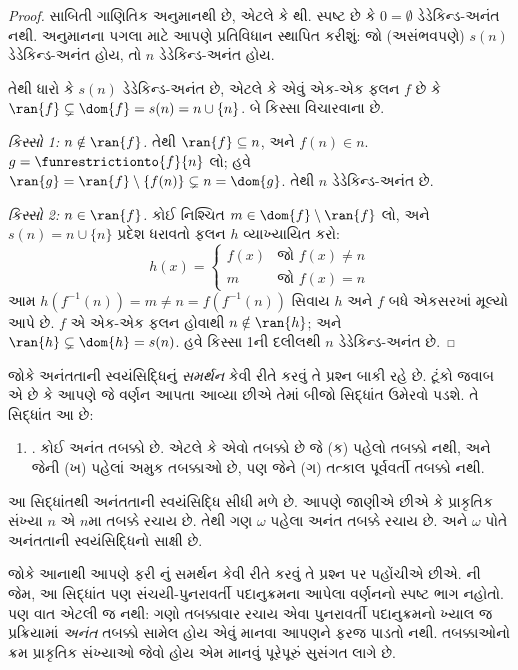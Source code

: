 \begin{proof}
સાબિતી ગાણિતિક અનુમાનથી છે, એટલે કે
થી.
સ્પષ્ટ છે કે $0
= \emptyset$ ડેડેકિન્ડ-અનંત નથી. અનુમાનના પગલા માટે આપણે
પ્રતિવિધાન સ્થાપિત કરીશું: જો (અસંભવપણે) $s(n)$ ડેડેકિન્ડ-અનંત
હોય, તો $n$ ડેડેકિન્ડ-અનંત હોય.

તેથી ધારો કે $s(n)$ ડેડેકિન્ડ-અનંત છે, એટલે કે એવું એક-એક ફલન
$f$ છે કે $\ran{f}\subsetneq \dom{f} = s(n) = n \cup
\{n\}$. બે કિસ્સા વિચારવાના છે.

\emph{કિસ્સો 1: $n \notin \ran{f}$.} તેથી $\ran{f} \subseteq n$,
અને $f(n) \in n$. $g = \funrestrictionto{f}{n}$ લો; હવે $\ran{g} =
\ran{f} \setminus \{f(n)\} \subsetneq n = \dom{g}$.
તેથી $n$ ડેડેકિન્ડ-અનંત છે.

\emph{કિસ્સો 2: $n \in \ran{f}$.} કોઈ નિશ્ચિત
$m \in \dom{f} \setminus \ran{f}$ લો, અને
$s(n) = n \cup \{n\}$ પ્રદેશ ધરાવતો ફલન $h$ વ્યાખ્યાયિત કરો:
\[
h(x) =
	\begin{cases}
		f(x) & \text{જો }f(x) \neq n\\
		m & \text{જો }f(x)=n
	\end{cases}
\]
આમ $h(f^{-1}(n)) = m
\neq n = f(f^{-1}(n))$ સિવાય $h$ અને $f$ બધે એકસરખાં મૂલ્યો
આપે છે. $f$ એ એક-એક ફલન હોવાથી $n \notin
\ran{h}$; અને $\ran{h} \subsetneq \dom{h} = s(n)$.
હવે કિસ્સા 1ની દલીલથી $n$ ડેડેકિન્ડ-અનંત છે.
\end{proof}

જોકે અનંતતાની સ્વયંસિદ્ધિનું \emph{સમર્થન} કેવી રીતે કરવું તે
પ્રશ્ન બાકી રહે છે. ટૂંકો જવાબ એ છે કે આપણે જે વર્ણન આપતા આવ્યા
છીએ તેમાં બીજો સિદ્ધાંત ઉમેરવો પડશે. તે સિદ્ધાંત આ છે:
\begin{enumerate}
	\item[] \stagesinf. કોઈ અનંત તબક્કો છે. એટલે કે એવો તબક્કો છે
જે (ક) પહેલો તબક્કો નથી, અને જેની (ખ) પહેલાં અમુક તબક્કાઓ છે,
પણ જેને (ગ) તત્કાલ પૂર્વવર્તી તબક્કો નથી.
\end{enumerate}
આ સિદ્ધાંતથી અનંતતાની સ્વયંસિદ્ધિ સીધી મળે છે. આપણે જાણીએ છીએ
કે પ્રાકૃતિક સંખ્યા $n$ એ $n$મા તબક્કે રચાય છે. તેથી ગણ
$\omega$ પહેલા અનંત તબક્કે રચાય છે. અને $\omega$ પોતે
અનંતતાની સ્વયંસિદ્ધિનો સાક્ષી છે.

જોકે આનાથી આપણે ફરી \stagesinf{}નું સમર્થન કેવી રીતે કરવું તે
પ્રશ્ન પર પહોંચીએ છીએ. \stagessucc{}ની જેમ, આ સિદ્ધાંત પણ
સંચયી-પુનરાવર્તી પદાનુક્રમના આપેલા વર્ણનનો સ્પષ્ટ ભાગ નહોતો.
પણ વાત એટલી જ નથી: ગણો તબક્કાવાર રચાય એવા પુનરાવર્તી
પદાનુક્રમનો ખ્યાલ જ પ્રક્રિયામાં \emph{અનંત} તબક્કો સામેલ હોય
એવું માનવા આપણને ફરજ પાડતો નથી. તબક્કાઓનો ક્રમ પ્રાકૃતિક
સંખ્યાઓ જેવો હોય એમ માનવું પૂરેપૂરું સુસંગત લાગે છે.


